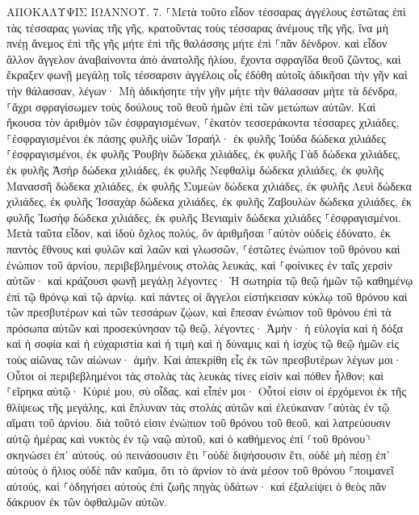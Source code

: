 \documentclass[twoside, 9pt]{extreport}
\begin{document}
ΑΠΟΚΑΛΥΨΙΣ ΙΩΑΝΝΟΥ.
7.
⸀Μετὰ τοῦτο εἶδον τέσσαρας ἀγγέλους ἑστῶτας ἐπὶ τὰς τέσσαρας γωνίας τῆς γῆς, κρατοῦντας τοὺς τέσσαρας ἀνέμους τῆς γῆς, ἵνα μὴ πνέῃ ἄνεμος ἐπὶ τῆς γῆς μήτε ἐπὶ τῆς θαλάσσης μήτε ἐπὶ ⸀πᾶν δένδρον. 
καὶ εἶδον ἄλλον ἄγγελον ἀναβαίνοντα ἀπὸ ἀνατολῆς ἡλίου, ἔχοντα σφραγῖδα θεοῦ ζῶντος, καὶ ἔκραξεν φωνῇ μεγάλῃ τοῖς τέσσαρσιν ἀγγέλοις οἷς ἐδόθη αὐτοῖς ἀδικῆσαι τὴν γῆν καὶ τὴν θάλασσαν, 
λέγων· Μὴ ἀδικήσητε τὴν γῆν μήτε τὴν θάλασσαν μήτε τὰ δένδρα, ⸀ἄχρι σφραγίσωμεν τοὺς δούλους τοῦ θεοῦ ἡμῶν ἐπὶ τῶν μετώπων αὐτῶν. 
Καὶ ἤκουσα τὸν ἀριθμὸν τῶν ἐσφραγισμένων, ⸀ἑκατὸν τεσσεράκοντα τέσσαρες χιλιάδες, ⸀ἐσφραγισμένοι ἐκ πάσης φυλῆς υἱῶν Ἰσραήλ· 
ἐκ φυλῆς Ἰούδα δώδεκα χιλιάδες ⸀ἐσφραγισμένοι, ἐκ φυλῆς Ῥουβὴν δώδεκα χιλιάδες, ἐκ φυλῆς Γὰδ δώδεκα χιλιάδες, 
ἐκ φυλῆς Ἀσὴρ δώδεκα χιλιάδες, ἐκ φυλῆς Νεφθαλὶμ δώδεκα χιλιάδες, ἐκ φυλῆς Μανασσῆ δώδεκα χιλιάδες, 
ἐκ φυλῆς Συμεὼν δώδεκα χιλιάδες, ἐκ φυλῆς Λευὶ δώδεκα χιλιάδες, ἐκ φυλῆς Ἰσσαχὰρ δώδεκα χιλιάδες, 
ἐκ φυλῆς Ζαβουλὼν δώδεκα χιλιάδες, ἐκ φυλῆς Ἰωσὴφ δώδεκα χιλιάδες, ἐκ φυλῆς Βενιαμὶν δώδεκα χιλιάδες ⸀ἐσφραγισμένοι. 
Μετὰ ταῦτα εἶδον, καὶ ἰδοὺ ὄχλος πολύς, ὃν ἀριθμῆσαι ⸀αὐτὸν οὐδεὶς ἐδύνατο, ἐκ παντὸς ἔθνους καὶ φυλῶν καὶ λαῶν καὶ γλωσσῶν, ⸀ἑστῶτες ἐνώπιον τοῦ θρόνου καὶ ἐνώπιον τοῦ ἀρνίου, περιβεβλημένους στολὰς λευκάς, καὶ ⸀φοίνικες ἐν ταῖς χερσὶν αὐτῶν· 
καὶ κράζουσι φωνῇ μεγάλῃ λέγοντες· Ἡ σωτηρία τῷ θεῷ ἡμῶν τῷ καθημένῳ ἐπὶ τῷ θρόνῳ καὶ τῷ ἀρνίῳ. 
καὶ πάντες οἱ ἄγγελοι εἱστήκεισαν κύκλῳ τοῦ θρόνου καὶ τῶν πρεσβυτέρων καὶ τῶν τεσσάρων ζῴων, καὶ ἔπεσαν ἐνώπιον τοῦ θρόνου ἐπὶ τὰ πρόσωπα αὐτῶν καὶ προσεκύνησαν τῷ θεῷ, 
λέγοντες· Ἀμήν· ἡ εὐλογία καὶ ἡ δόξα καὶ ἡ σοφία καὶ ἡ εὐχαριστία καὶ ἡ τιμὴ καὶ ἡ δύναμις καὶ ἡ ἰσχὺς τῷ θεῷ ἡμῶν εἰς τοὺς αἰῶνας τῶν αἰώνων· ἀμήν. 
Καὶ ἀπεκρίθη εἷς ἐκ τῶν πρεσβυτέρων λέγων μοι· Οὗτοι οἱ περιβεβλημένοι τὰς στολὰς τὰς λευκὰς τίνες εἰσὶν καὶ πόθεν ἦλθον; 
καὶ ⸀εἴρηκα αὐτῷ· Κύριέ μου, σὺ οἶδας. καὶ εἶπέν μοι· Οὗτοί εἰσιν οἱ ἐρχόμενοι ἐκ τῆς θλίψεως τῆς μεγάλης, καὶ ἔπλυναν τὰς στολὰς αὐτῶν καὶ ἐλεύκαναν ⸀αὐτὰς ἐν τῷ αἵματι τοῦ ἀρνίου. 
διὰ τοῦτό εἰσιν ἐνώπιον τοῦ θρόνου τοῦ θεοῦ, καὶ λατρεύουσιν αὐτῷ ἡμέρας καὶ νυκτὸς ἐν τῷ ναῷ αὐτοῦ, καὶ ὁ καθήμενος ἐπὶ ⸂τοῦ θρόνου⸃ σκηνώσει ἐπ᾽ αὐτούς. 
οὐ πεινάσουσιν ἔτι ⸀οὐδὲ διψήσουσιν ἔτι, οὐδὲ μὴ πέσῃ ἐπ᾽ αὐτοὺς ὁ ἥλιος οὐδὲ πᾶν καῦμα, 
ὅτι τὸ ἀρνίον τὸ ἀνὰ μέσον τοῦ θρόνου ⸀ποιμανεῖ αὐτούς, καὶ ⸀ὁδηγήσει αὐτοὺς ἐπὶ ζωῆς πηγὰς ὑδάτων· καὶ ἐξαλείψει ὁ θεὸς πᾶν δάκρυον ἐκ τῶν ὀφθαλμῶν αὐτῶν. 
\end{document}
